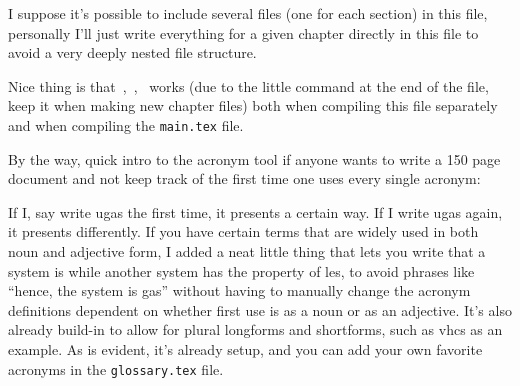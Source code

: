 \documentclass[main.tex]{subfiles}
\begin{document}
I suppose it's possible to include several files (one for each section) in this file, personally I'll just write everything for a given chapter directly in this file to avoid a very deeply nested file structure.

Nice thing is that~\cite{khalilNonlinearSystems2002},~\cite{kelasidiModelingUnderwaterSnake2014},~\cite{liljebackControllabilityStabilityAnalysis2010} works (due to the little command at the end of the file, keep it when making new chapter files) both when compiling this file separately and when compiling the \texttt{main.tex} file.

By the way, quick intro to the acronym tool if anyone wants to write a 150 page document and not keep track of the first time one uses every single acronym:

If I, say write \gls{ugas} the first time, it presents a certain way. If I write \gls{ugas} again, it presents differently. If you have certain terms that are widely used in both noun and adjective form, I added a neat little thing that lets you write that a system is  while another system has the property of \gls{les}, to avoid phrases like ``hence, the system is \gls{gas}'' without having to manually change the acronym definitions dependent on whether first use is as a noun or as an adjective. It's also already build-in to allow for plural longforms and shortforms, such as \glspl{vhc} as an example. As is evident, it's already setup, and you can add your own favorite acronyms in the \texttt{glossary.tex} file.

\ifSubfilesClassLoaded{%
  
  
}{}
\end{document}
